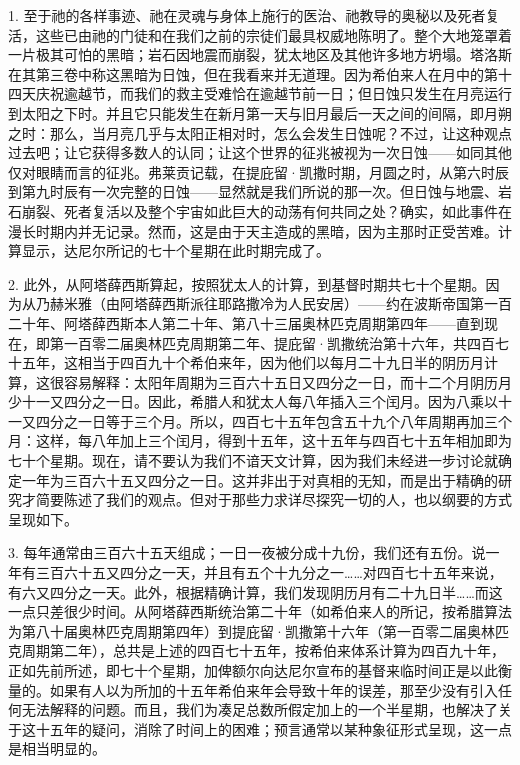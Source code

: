 1. 至于祂的各样事迹、祂在灵魂与身体上施行的医治、祂教导的奥秘以及死者复活，这些已由祂的门徒和在我们之前的宗徒们最具权威地陈明了。整个大地笼罩着一片极其可怕的黑暗；岩石因地震而崩裂，犹太地区及其他许多地方坍塌。塔洛斯在其第三卷中称这黑暗为日蚀，但在我看来并无道理。因为希伯来人在月中的第十四天庆祝逾越节，而我们的救主受难恰在逾越节前一日；但日蚀只发生在月亮运行到太阳之下时。并且它只能发生在新月第一天与旧月最后一天之间的间隔，即月朔之时：那么，当月亮几乎与太阳正相对时，怎么会发生日蚀呢？不过，让这种观点过去吧；让它获得多数人的认同；让这个世界的征兆被视为一次日蚀——如同其他仅对眼睛而言的征兆。弗莱贡记载，在提庇留·凯撒时期，月圆之时，从第六时辰到第九时辰有一次完整的日蚀——显然就是我们所说的那一次。但日蚀与地震、岩石崩裂、死者复活以及整个宇宙如此巨大的动荡有何共同之处？确实，如此事件在漫长时期内并无记录。然而，这是由于天主造成的黑暗，因为主那时正受苦难。计算显示，达尼尔所记的七十个星期在此时期完成了。\par

2. 此外，从阿塔薛西斯算起，按照犹太人的计算，到基督时期共七十个星期。因为从乃赫米雅（由阿塔薛西斯派往耶路撒冷为人民安居）——约在波斯帝国第一百二十年、阿塔薛西斯本人第二十年、第八十三届奥林匹克周期第四年——直到现在，即第一百零二届奥林匹克周期第二年、提庇留·凯撒统治第十六年，共四百七十五年，这相当于四百九十个希伯来年，因为他们以每月二十九日半的阴历月计算，这很容易解释：太阳年周期为三百六十五日又四分之一日，而十二个月阴历月少十一又四分之一日。因此，希腊人和犹太人每八年插入三个闰月。因为八乘以十一又四分之一日等于三个月。所以，四百七十五年包含五十九个八年周期再加三个月：这样，每八年加上三个闰月，得到十五年，这十五年与四百七十五年相加即为七十个星期。现在，请不要认为我们不谙天文计算，因为我们未经进一步讨论就确定一年为三百六十五又四分之一日。这并非出于对真相的无知，而是出于精确的研究才简要陈述了我们的观点。但对于那些力求详尽探究一切的人，也以纲要的方式呈现如下。\par

3. 每年通常由三百六十五天组成；一日一夜被分成十九份，我们还有五份。说一年有三百六十五又四分之一天，并且有五个十九分之一……对四百七十五年来说，有六又四分之一天。此外，根据精确计算，我们发现阴历月有二十九日半……而这一点只差很少时间。从阿塔薛西斯统治第二十年（如希伯来人的所记，按希腊算法为第八十届奥林匹克周期第四年）到提庇留·凯撒第十六年（第一百零二届奥林匹克周期第二年），总共是上述的四百七十五年，按希伯来体系计算为四百九十年，正如先前所述，即七十个星期，加俾额尔向达尼尔宣布的基督来临时间正是以此衡量的。如果有人以为所加的十五年希伯来年会导致十年的误差，那至少没有引入任何无法解释的问题。而且，我们为凑足总数所假定加上的一个半星期，也解决了关于这十五年的疑问，消除了时间上的困难；预言通常以某种象征形式呈现，这一点是相当明显的。\par

